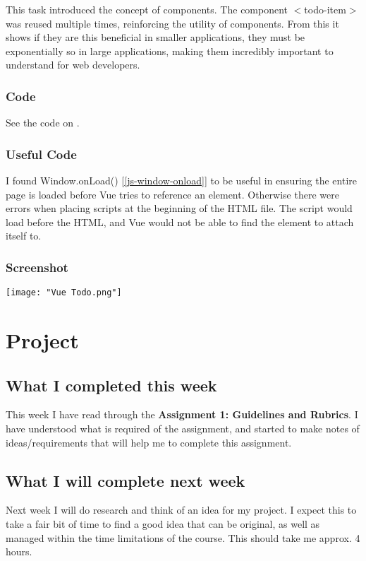 \documentclass[portfolio.tex]{subfiles}
\begin{document}
				This task introduced the concept of components. The component $<$todo-item$>$ was reused multiple times, reinforcing the utility of components. From this it shows if they are this beneficial in smaller applications, they must be exponentially so in large applications, making them incredibly important to understand for web developers.\\

				\subsubsection{Code}
				See the code on .

				\subsubsection{Useful Code}
					I found Window.onLoad() [\ref{js-window-onload}] to be useful in ensuring the entire page is loaded before Vue tries to reference an element. Otherwise there were errors when placing scripts at the beginning of the HTML file. The script would load before the HTML, and Vue would not be able to find the element to attach itself to.\\
				\subsubsection{Screenshot}
					\begin{center}
						\texttt{[image: "Vue Todo.png"]}
					\end{center}

		\section{Project}
			\subsection{What I completed this week}
				This week I have read through the \textbf{Assignment 1: Guidelines and Rubrics}. I have understood what is required of the assignment, and started to make notes of ideas/requirements that will help me to complete this assignment.
			\subsection{What I will complete next week}
				Next week I will do research and think of an idea for my project. I expect this to take a fair bit of time to find a good idea that can be original, as well as managed within the time limitations of the course. This should take me approx. 4 hours.

	\pagebreak
\end{document}
